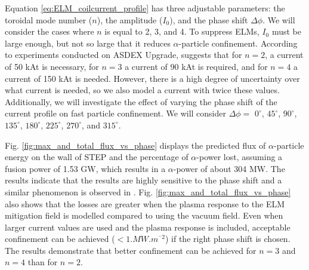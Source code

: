 \documentclass[10pt, a4paper, twoside]{article}
\begin{document}
Equation \ref{eq:ELM_coilcurrent_profile} has three adjustable parameters: the toroidal mode number ($n$), the amplitude ($I_0$), and the phase shift $\Delta \phi$. We will consider the cases where $n$ is equal to 2, 3, and 4. To suppress ELMs, $I_0$ must be large enough, but not so large that it reduces $\alpha$-particle confinement. According to experiments conducted on ASDEX Upgrade, \cite{ryan2022} suggests that for $n=2$, a current of 50 kAt is necessary, for $n=3$ a current of 90 kAt is required, and for $n=4$ a current of 150 kAt is needed. However, there is a high degree of uncertainty over what current is needed, so we also model a current with twice these values. Additionally, we will investigate the effect of varying the phase shift of the current profile on fast particle confinement. We will consider $\Delta\phi =$ $0^\circ$, $45^\circ$, $90^\circ$, $135^\circ$, $180^\circ$, $225^\circ$, $270^\circ$, and $315^\circ$.

Fig. \ref{fig:max_and_total_flux_vs_phase} displays the predicted flux of $\alpha$-particle energy on the wall of STEP and the percentage of $\alpha$-power lost, assuming a fusion power of 1.53 GW, which results in a $\alpha$-power of about 304 MW. The results indicate that the results are highly sensitive to the phase shift and a similar phenomenon is observed in \cite{sanchis2018}. Fig. \ref{fig:max_and_total_flux_vs_phase} also shows that the losses are greater when the plasma response to the ELM mitigation field is modelled compared to using the vacuum field. Even when larger current values are used and the plasma response is included, acceptable confinement can be achieved ($<1\si{.MW.m^{^-2}}$) if the right phase shift is chosen. The results demonstrate that better confinement can be achieved for $n=3$ and $n=4$ than for $n=2$. 
\end{document}
